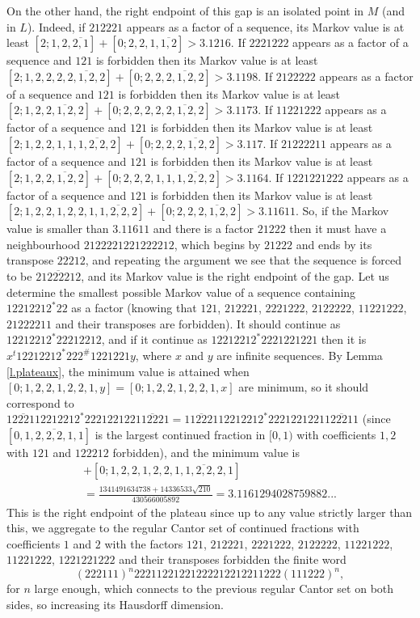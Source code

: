 \documentclass[10pt]{amsart}
\numberwithin{equation}{section}
\theoremstyle{definition}
\begin{document}
On the other hand, the right endpoint of this gap is an isolated point in $M$
(and in $L$). Indeed, if $212221$ appears as a factor of a sequence, its Markov
value is at least $[2;1,2,\overline{2,1}]+[0;2,2,1,\overline{1,2}]>3.1216$. If
$2221222$ appears as a factor of a sequence and $121$ is forbidden then its
Markov value is at least
$[2;1,2,2,2,\overline{2,1,2,2}]+[0;2,2,\overline{2,1,2,2}]>3.1198$. If $2122222$
appears as a factor of a sequence and $121$ is forbidden then its Markov value
is at least $[2;1,2,\overline{2,1,2,2}]+[0;2,2,2,2,\overline{2,1,2,2}]>3.1173$.
If $11221222$ appears as a factor of a sequence and $121$ is forbidden then its
Markov value is at least
$[2;1,2,2,1,1,\overline{1,2,2,2}]+[0;2,2,\overline{2,1,2,2}]>3.117$. If
$21222211$ appears as a factor of a sequence and $121$ is forbidden then its
Markov value is at least
$[2;1,2,\overline{2,1,2,2}]+[0;2,2,2,1,1,\overline{1,2,2,2}]>3.1164$. If
$1221221222$ appears as a factor of a sequence and $121$ is forbidden then its
Markov value is at least
$[2;1,2,2,1,2,2,1,\overline{1,2,2,2}]+[0;2,2,\overline{2,1,2,2}]>3.11611$. So,
if the Markov value is smaller than $3.11611$ and there is a factor $21222$ then
it must have a neighbourhood $2122221221222212$, which begins by $21222$ and
ends by its transpose $22212$, and repeating the argument we see that the
sequence is forced to be $\overline{21222212}$, and its Markov value is the
right endpoint of the gap. Let us determine the smallest possible Markov value
of a sequence containing $12212212^*22$ as a factor (knowing that $121$,
$212221$, $2221222$, $2122222$, $11221222$, $21222211$ and their transposes are
forbidden). It should continue as $12212212^*22212212$, and if it continue as
$12212212^*2221221221$ then it is $x^{t}12212212^*222^{\#}1221221y$, where $x$
and $y$ are infinite sequences. By Lemma \ref{l.plateaux}, the minimum value is
attained when $[0;1,2,2,1,2,2,1,y]=[0;1,2,2,1,2,2,1,x]$ are minimum, so it
should correspond to
$\overline{122211}2212212^*222122122\overline{112221}=\overline{112221}12212212^*2221221221\overline{122211}$
(since $[0,\overline{1,2,2,2,1,1}]$ is the largest continued fraction in $[0,1)$
with coefficients $1, 2$ with $121$ and $122212$ forbidden), and the minimum
value is
\begin{multline*}
    [2;2,2,2,1,2,2,1,2,2,\overline{1,1,2,2,2,1}]+[0;1,2,2,1,2,2,\overline{1,1,2,2,2,1}] \\
    =\frac{1341491634738+14336533\sqrt{210}}{430566005892}=3.1161294028759882...
\end{multline*}
This is the right endpoint of the plateau since up to any value strictly larger
than this, we aggregate to the regular Cantor set of continued fractions with
coefficients $1$ and $2$ with the factors $121$, $212221$, $2221222$, $2122222$,
$11221222$, $11221222$, $1221221222$ and their transposes forbidden the finite
word 
$$(222111)^n 22211221221222212212211222 (111222)^n,$$ for $n$ large enough, which connects to the previous regular Cantor set on both sides, so increasing its Hausdorff dimension. 
\end{document}
